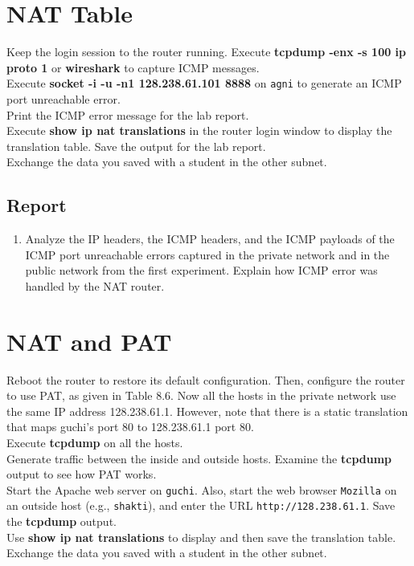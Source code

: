 \documentclass[10pt,a4paper]{article}
\numberwithin{equation}{section}
\numberwithin{figure}{section}
\numberwithin{table}{section}
\begin{document}
\section{NAT Table}
    Keep the login session to the router running. Execute \textbf{tcpdump -enx -s 100 ip proto 1} or \textbf{wireshark} to capture ICMP messages. \\
    Execute \textbf{socket -i -u -n1 128.238.61.101 8888} on \texttt{agni} to generate an ICMP port unreachable error. \\
    Print the ICMP error message for the lab report. \\
    Execute \textbf{show ip nat translations} in the router login window to display the translation table.
    Save the output for the lab report.\\
    Exchange the data you saved with a student in the other subnet.
    \subsection*{Report}
    \begin{enumerate}
        \item Analyze the IP headers, the ICMP headers, and the ICMP payloads of the ICMP port unreachable errors captured in the private network and in the public network from the first experiment.
        Explain how ICMP error was handled by the NAT router.
    \end{enumerate}

\section{NAT and PAT}
    Reboot the router to restore its default configuration.
    Then, configure the router to use PAT, as given in Table 8.6. Now all the hosts in the private network use the same IP address 128.238.61.1. However, note that there is a static translation that maps guchi’s port 80 to 128.238.61.1 port 80. \\
    Execute \textbf{tcpdump} on all the hosts. \\
    Generate traffic between the inside and outside hosts.
    Examine the \textbf{tcpdump} output to see how PAT works.\\
    Start the Apache web server on \texttt{guchi}. Also, start the web browser \texttt{Mozilla} on an outside host (e.g., \texttt{shakti}), and enter the URL \texttt{http://128.238.61.1}. Save the \textbf{tcpdump} output.\\
    Use \textbf{show ip nat translations} to display and then save the translation table.
    Exchange the data you saved with a student in the other subnet.
\end{document}
